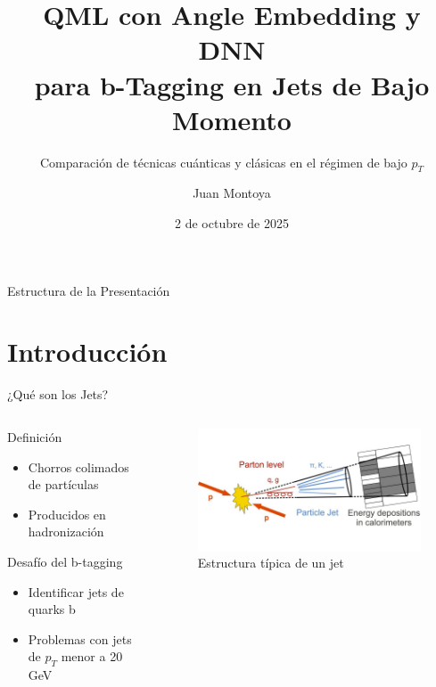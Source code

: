 \documentclass[aspectratio=43]{beamer}
\title[QML para b-Tagging]{QML con Angle Embedding y DNN\\para b-Tagging en Jets de Bajo Momento}
\subtitle{Comparación de técnicas cuánticas y clásicas en el régimen de bajo \texorpdfstring{$p_T$}{pT}}
\author[J. Montoya]{Juan Montoya}
\institute[UdeA]{
  Instituto de Física\\
  Universidad de Antioquia\\
}
\date[2 Oct 2025]{2 de octubre de 2025}
\begin{document}
\begin{frame}
  \titlepage
\end{frame}

\begin{frame}{Estructura de la Presentación}
  \tableofcontents
\end{frame}

\section{Introducción}

\begin{frame}{¿Qué son los Jets?}
  \begin{columns}
    \begin{column}{0.47\textwidth}
      \begin{block}{Definición}
        \begin{itemize}
          \item Chorros colimados de partículas
          \item Producidos en hadronización
        \end{itemize}
      \end{block}
      
      \begin{alertblock}{Desafío del b-tagging}
        \begin{itemize}
          \item Identificar jets de quarks b
          \item Problemas con jets de \texorpdfstring{$p_T$}{pT} menor a 20 GeV
        \end{itemize}
      \end{alertblock}
    \end{column}
    
    \begin{column}{0.55\textwidth}
      \begin{figure}
        \centering
        \includegraphics[width=\textwidth]{jet1.png}
        \caption{Estructura típica de un jet}
      \end{figure}
    \end{column}
  \end{columns}
\end{frame}
\end{document}
